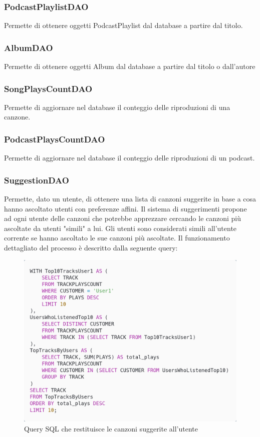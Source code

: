 \documentclass{article}
\begin{document}
  \subsubsection{PodcastPlaylistDAO}
  Permette di ottenere oggetti PodcastPlaylist dal database a partire dal titolo.

  \subsubsection{AlbumDAO}
  Permette di ottenere oggetti Album dal database a partire dal titolo o dall'autore

  \subsubsection{SongPlaysCountDAO}
  Permette di aggiornare nel database il conteggio delle riproduzioni di una canzone.

  \subsubsection{PodcastPlaysCountDAO}
  Permette di aggiornare nel database il conteggio delle riproduzioni di un podcast.

  \subsubsection{SuggestionDAO}
  Permette, dato un utente, di ottenere una lista di canzoni suggerite in base a cosa hanno ascoltato utenti con preferenze affini. Il sistema di suggerimenti propone ad ogni utente delle canzoni che potrebbe apprezzare cercando le canzoni più ascoltate da utenti "simili" a lui.
  Gli utenti sono considerati simili all'utente corrente se hanno ascoltato le sue canzoni più ascoltate.
  Il funzionamento dettagliato del processo è descritto dalla seguente query:
  \begin{figure}
    \centering
    \includegraphics[width=0.7\linewidth]{query.png}
    \caption{Query SQL che restituisce le canzoni suggerite all'utente}
    \label{fig:query}
  \end{figure}
\end{document}
